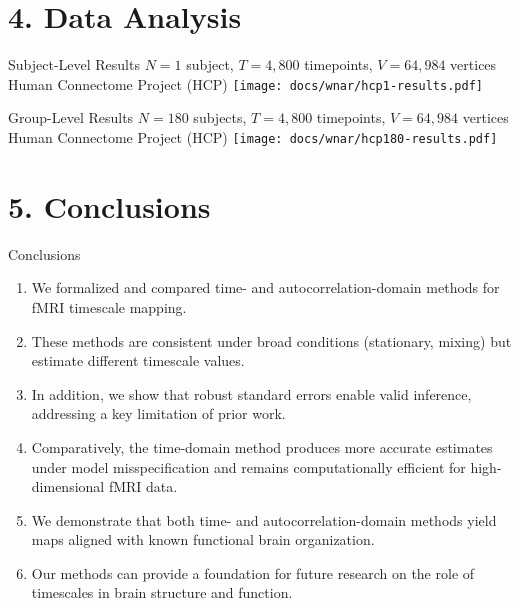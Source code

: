 \documentclass[8pt,aspectratio=169]{beamer}
\begin{document}
\section{4. Data Analysis}


\begin{frame}{Subject-Level Results}
$N = 1$ subject, \;$T = 4,800$ timepoints,\; $V = 64,984$ vertices \hfill Human Connectome Project (HCP)
\vfill
\centering
\texttt{[image: docs/wnar/hcp1-results.pdf]}
\end{frame}

\begin{frame}{Group-Level Results}
$N = 180$ subjects, \;$T = 4,800$ timepoints,\; $V = 64,984$ vertices \hfill  Human Connectome Project (HCP)
\vfill
\centering
\texttt{[image: docs/wnar/hcp180-results.pdf]}
\end{frame}

\section{5. Conclusions}

\begin{frame}{Conclusions}
\begin{enumerate}
    \item We formalized and compared time- and autocorrelation-domain methods for fMRI timescale mapping.
    \vspace{2mm}
    \item These methods are consistent under broad conditions (stationary, mixing) but estimate different timescale values.
    \vspace{2mm}
    \item In addition, we show that robust standard errors enable valid inference, addressing a key limitation of prior work.
    \vspace{2mm}
    \item Comparatively, the time-domain method produces more accurate estimates under model misspecification and remains computationally efficient for high-dimensional fMRI data.
    \vspace{2mm}
    \item We demonstrate that both time- and autocorrelation-domain methods yield maps aligned with known functional brain organization.
    \vspace{2mm}
    \item Our methods can provide a foundation for future research on the role of timescales in brain structure and function.
\end{enumerate}
\end{frame}
\end{document}
